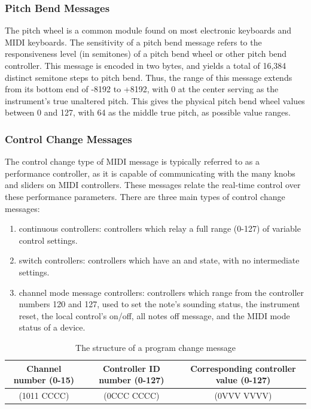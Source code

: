 \subsubsection{Pitch Bend Messages}

The pitch wheel is a common module found on most electronic keyboards and MIDI keyboards. The sensitivity of a pitch bend message refers to the responsiveness level (in semitones) of a pitch bend wheel or other pitch bend controller. This message is encoded in two bytes\cite{McGuire_2014}, and yields a total of 16,384 distinct semitone steps to pitch bend. Thus, the range of this message extends from its bottom end of -8192 to +8192, with 0 at the center serving as the instrument's true unaltered pitch\cite{Huber_2012}. This gives the physical pitch bend wheel values between 0 and 127, with 64 as the middle true pitch, as possible value ranges.

\subsubsection{Control Change Messages}

The control change type of MIDI message is typically referred to as a performance controller, as it is capable of communicating with the many knobs and sliders on MIDI controllers. These messages relate the real-time control over these performance parameters. There are three main types of control change messages:

\begin{enumerate}
	\item continuous controllers: controllers which relay a full range (0-127) of variable control settings.
	\item switch controllers: controllers which have an  and  state, with no intermediate settings.
	\item channel mode message controllers: controllers which range from the controller numbers 120 and 127, used to set the note's sounding status, the instrument reset, the local control's on/off, all notes off message, and the MIDI mode status of a device.
\end{enumerate}

\begin{table}
	\centering
	\begin{tabular}{|c|c|c|}
	\hline
		Channel number (0-15) & Controller ID number (0-127) & Corresponding controller value (0-127) \\
		\hline
		(1011 CCCC) & (0CCC CCCC) & (0VVV VVVV) \\
	\hline
	\end{tabular}
	\caption{The structure of a program change message}
	\label{tbl:byte-structure-control-change-message}
\end{table}

